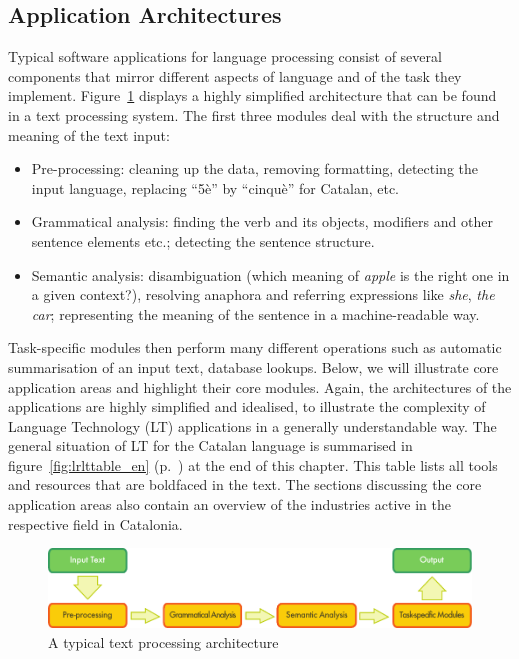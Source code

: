 \begin{multicols}{2}
\subsection{Application Architectures}

Typical software applications for language processing consist of several components that mirror different aspects of language and of the task they implement. Figure~\ref{fig:textprocessingarch_en} displays a highly simplified architecture that can be found in a text processing system. The first three modules deal with the structure and meaning of the text input:
\begin{itemize}
\item Pre-processing: cleaning up the data, removing formatting, detecting the input language, replacing “5è” by “cinquè” for Catalan, etc.
\item Grammatical analysis: finding the verb and its objects, modifiers and other sentence elements etc.; detecting the sentence structure.
\item Semantic analysis: disambiguation (which meaning of \textit{apple} is the right one in a given context?), resolving anaphora and referring expressions like \textit{she}, \textit{the car}; representing the meaning of the sentence in a machine-readable way.
\end{itemize}

Task-specific modules then perform many different operations such as automatic summarisation of an input text, database lookups. Below, we will illustrate core application areas and highlight their core modules. Again, the architectures of the applications are highly simplified and idealised, to illustrate the complexity of Language Technology (LT) applications in a generally understandable way. The general situation of LT for the Catalan language is summarised in figure~\ref{fig:lrlttable_en} (p.~\pageref{fig:lrlttable_en}) at the end of this chapter. This table lists all tools and resources that are boldfaced in the text.  The sections discussing the core application areas also contain an overview of the industries active in the respective field in Catalonia. 


\begin{figure}[bt]
  \center
  \includegraphics[width=\textwidth]{../_media/english/text_processing_app_architecture}
  \caption{A typical text processing architecture}
  \label{fig:textprocessingarch_en}
\end{figure}



\end{multicols}
